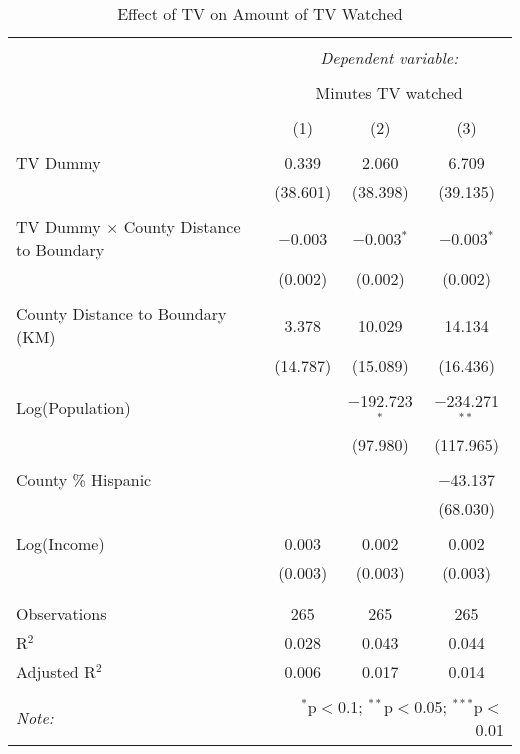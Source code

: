 
\begin{table}[!htbp] \centering 
  \caption{Effect of TV on Amount of TV Watched} 
  \label{} 
\begin{tabular}{@{\extracolsep{-5pt}}lccc} 
\\[-1.8ex]\hline 
\hline \\[-1.8ex] 
 & \multicolumn{3}{c}{\textit{Dependent variable:}} \\ 
\cline{2-4} 
\\[-1.8ex] & \multicolumn{3}{c}{Minutes TV watched} \\ 
\\[-1.8ex] & (1) & (2) & (3)\\ 
\hline \\[-1.8ex] 
 TV Dummy & 0.339 & 2.060 & 6.709 \\ 
  & (38.601) & (38.398) & (39.135) \\ 
  & & & \\ 
 TV Dummy $\times$ County Distance to Boundary  & $-$0.003 & $-$0.003$^{*}$ & $-$0.003$^{*}$ \\ 
  & (0.002) & (0.002) & (0.002) \\ 
  & & & \\ 
 County Distance to Boundary (KM) & 3.378 & 10.029 & 14.134 \\ 
  & (14.787) & (15.089) & (16.436) \\ 
  & & & \\ 
 Log(Population) &  & $-$192.723$^{*}$ & $-$234.271$^{**}$ \\ 
  &  & (97.980) & (117.965) \\ 
  & & & \\ 
 County \% Hispanic &  &  & $-$43.137 \\ 
  &  &  & (68.030) \\ 
  & & & \\ 
 Log(Income) & 0.003 & 0.002 & 0.002 \\ 
  & (0.003) & (0.003) & (0.003) \\ 
  & & & \\ 
\hline \\[-1.8ex] 
Observations & 265 & 265 & 265 \\ 
R$^{2}$ & 0.028 & 0.043 & 0.044 \\ 
Adjusted R$^{2}$ & 0.006 & 0.017 & 0.014 \\ 
\hline 
\hline \\[-1.8ex] 
\textit{Note:}  & \multicolumn{3}{r}{$^{*}$p$<$0.1; $^{**}$p$<$0.05; $^{***}$p$<$0.01} \\ 
\end{tabular} 
\end{table} 
